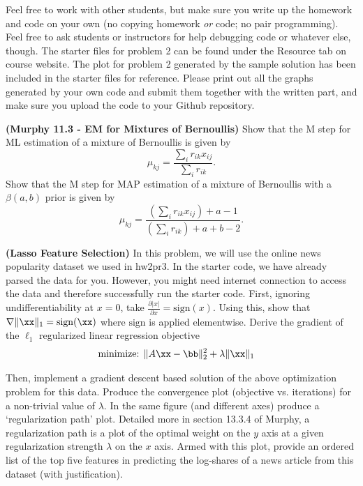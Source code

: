 \documentclass[12pt,letterpaper,fleqn]{hmcpset}
\begin{document}
Feel free to work with other students, but make sure you write up the homework
and code on your own (no copying homework \textit{or} code; no pair programming).
Feel free to ask students or instructors for help debugging code or whatever else,
though.
\newline
\newline
The starter files for problem 2 can be found under the Resource tab on course website. The plot for problem 2 generated by the sample solution has been included in the starter files for reference. Please print out all the graphs generated by your own code and submit them together with the written part, and make sure you upload the code to your Github repository.

\begin{problem}[1]
	\textbf{(Murphy 11.3 - EM for Mixtures of Bernoullis)} Show that the M step for ML estimation
	of a mixture of Bernoullis is given by
	\[
		\mu_{kj} = \frac{\sum_i r_{ik}x_{ij}}{\sum_i r_{ik}}.
	\]
	Show that the M step for MAP estimation of a mixture of Bernoullis with a $\beta(a,b)$ prior
	is given by
	\[
		\mu_{kj} = \frac{\left(\sum_i r_{ik}x_{ij}\right) + a - 1}{\left(\sum_i r_{ik}\right) + a + b - 2}.
	\]
\end{problem}
\begin{solution}
	\vfill
\end{solution}
\newpage



\begin{problem}[2]
	\textbf{(Lasso Feature Selection)}
	In this problem, we will use the online news popularity dataset we used in hw2pr3. In the starter code, we have already parsed the data for you. However, you might need internet connection to access the data and therefore successfully run the starter code.
	\newline
	\newline
	First, ignoring undifferentiability at $x=0$, take $\frac{\partial |x|}{\partial x}
		= \mathrm{sign} (x)$. Using this, show that $\nabla \|\xx\|_1 = \mathrm{sign}(\xx)$ where $\mathrm{sign}$ is applied
	elementwise. Derive the gradient of the $\ell_1$ regularized linear regression objective
	\begin{align*}
		\text{minimize: } & \|A\xx - \bb\|_2^2 + \lambda \|\xx\|_1
	\end{align*}

	Then, implement a gradient descent based solution of the above optimization problem for this data. Produce
	the convergence plot (objective vs. iterations) for a non-trivial value of $\lambda$.
	In the same figure (and different axes) produce a `regularization path' plot. Detailed
	more in section 13.3.4 of Murphy, a regularization path is a plot of the optimal weight on
	the $y$ axis at a given regularization strength $\lambda$ on the $x$ axis. Armed with this
	plot, provide an ordered list of the top five features in predicting the log-shares of a news
	article from this dataset (with justification).
\end{problem}
\begin{solution}
	\vfill
\end{solution}
\newpage
\end{document}
